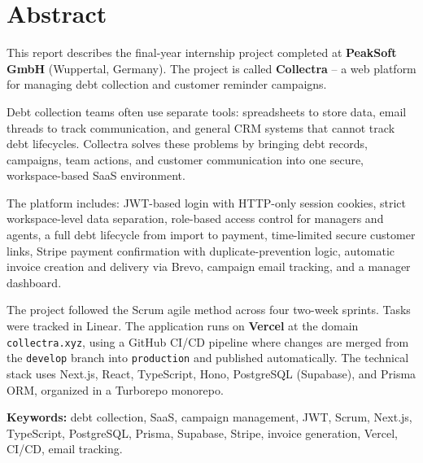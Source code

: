 \documentclass[12pt,a4paper]{report}
\begin{document}
\chapter*{Abstract}
{}

This report describes the final-year internship project completed at
\textbf{PeakSoft GmbH} (Wuppertal, Germany).
The project is called \textbf{Collectra} -- a web platform for managing debt
collection and customer reminder campaigns.

Debt collection teams often use separate tools: spreadsheets to store data, email
threads to track communication, and general CRM systems that cannot track debt
lifecycles.
Collectra solves these problems by bringing debt records, campaigns, team actions,
and customer communication into one secure, workspace-based SaaS environment.

The platform includes: JWT-based login with HTTP-only session cookies, strict
workspace-level data separation, role-based access control for managers and agents,
a full debt lifecycle from import to payment, time-limited secure customer links,
Stripe payment confirmation with duplicate-prevention logic, automatic invoice
creation and delivery via Brevo, campaign email tracking, and a manager dashboard.

The project followed the Scrum agile method across four two-week sprints.
Tasks were tracked in Linear.
The application runs on \textbf{Vercel} at the domain \texttt{collectra.xyz},
using a GitHub CI/CD pipeline where changes are merged from the \texttt{develop}
branch into \texttt{production} and published automatically.
The technical stack uses Next.js, React, TypeScript, Hono, PostgreSQL (Supabase),
and Prisma ORM, organized in a Turborepo monorepo.

\medskip
\noindent\textbf{Keywords:}
debt collection, SaaS, campaign management, JWT, Scrum, Next.js, TypeScript,
PostgreSQL, Prisma, Supabase, Stripe, invoice generation, Vercel, CI/CD,
email tracking.

\clearpage


\hypersetup{linkcolor=black, urlcolor=black, citecolor=black}
\tableofcontents
\clearpage


\listoffigures
\clearpage
\end{document}
